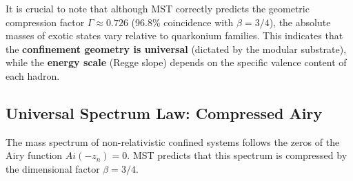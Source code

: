 \documentclass[11pt, a4paper]{article}
\theoremstyle{plain}
\theoremstyle{definition}
\begin{document}
\begin{table}[H]
\centering
\caption{Experimental validation of modular confinement (2024-2025)}
\label{tab:hadronic_validation}
\end{table}

It is crucial to note that although MST correctly predicts the geometric compression factor $\Gamma \approx 0.726$ (96.8\% coincidence with $\beta=3/4$), the absolute masses of exotic states vary relative to quarkonium families. This indicates that the \textbf{confinement geometry is universal} (dictated by the modular substrate), while the \textbf{energy scale} (Regge slope) depends on the specific valence content of each hadron.

\subsection{Universal Spectrum Law: Compressed Airy}
\label{subsec:airy_spectrum}

The mass spectrum of non-relativistic confined systems follows the zeros of the Airy function $Ai(-z_n)=0$. MST predicts that this spectrum is compressed by the dimensional factor $\beta = 3/4$.
\end{document}
